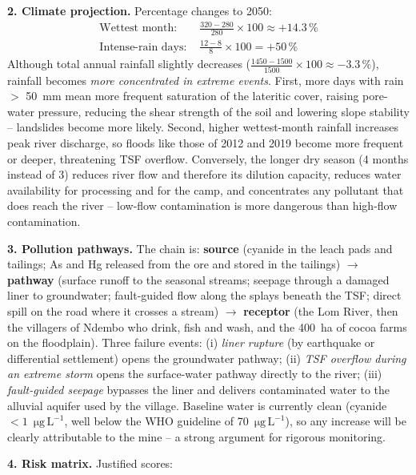 \documentclass[11pt]{article}
\begin{document}
\textbf{2. Climate projection.} Percentage changes to 2050:
\begin{align*}
\text{Wettest month: } & \frac{320 - 280}{280} \times 100 \approx +14.3\,\% \\
\text{Intense-rain days: } & \frac{12 - 8}{8} \times 100 = +50\,\%
\end{align*}
Although total annual rainfall slightly decreases ($\frac{1450-1500}{1500}\times 100 \approx -3.3\,\%$), rainfall becomes \emph{more concentrated in extreme events}. First, more days with rain $>$ \SI{50}{mm} mean more frequent saturation of the lateritic cover, raising pore-water pressure, reducing the shear strength of the soil and lowering slope stability -- landslides become more likely. Second, higher wettest-month rainfall increases peak river discharge, so floods like those of 2012 and 2019 become more frequent or deeper, threatening TSF overflow. Conversely, the longer dry season (4 months instead of 3) reduces river flow and therefore its dilution capacity, reduces water availability for processing and for the camp, and concentrates any pollutant that does reach the river -- low-flow contamination is more dangerous than high-flow contamination.

\textbf{3. Pollution pathways.} The chain is: \textbf{source} (cyanide in the leach pads and tailings; As and Hg released from the ore and stored in the tailings) $\rightarrow$ \textbf{pathway} (surface runoff to the seasonal streams; seepage through a damaged liner to groundwater; fault-guided flow along the splays beneath the TSF; direct spill on the road where it crosses a stream) $\rightarrow$ \textbf{receptor} (the Lom River, then the villagers of Ndembo who drink, fish and wash, and the 400~ha of cocoa farms on the floodplain). Three failure events: (i) \emph{liner rupture} (by earthquake or differential settlement) opens the groundwater pathway; (ii) \emph{TSF overflow during an extreme storm} opens the surface-water pathway directly to the river; (iii) \emph{fault-guided seepage} bypasses the liner and delivers contaminated water to the alluvial aquifer used by the village. Baseline water is currently clean (cyanide $< 1$~$\mathrm{\mu g\,L^{-1}}$, well below the WHO guideline of 70~$\mathrm{\mu g\,L^{-1}}$), so any increase will be clearly attributable to the mine -- a strong argument for rigorous monitoring.

\textbf{4. Risk matrix.} Justified scores:
\end{document}
